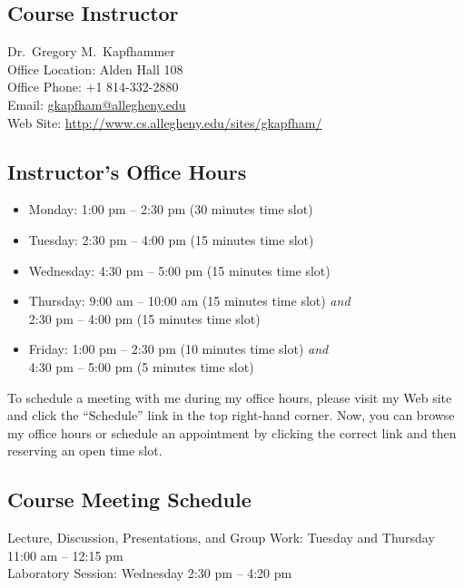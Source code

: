 



\subsection*{Course Instructor}
Dr.\ Gregory M.\ Kapfhammer\\
\noindent Office Location: Alden Hall 108 \\
\noindent Office Phone: +1 814-332-2880 \\
\noindent Email: \url{gkapfham@allegheny.edu} \\
\noindent Web Site: \url{http://www.cs.allegheny.edu/sites/gkapfham/}

\subsection*{Instructor's Office Hours}

\begin{itemize}
	\itemsep 0em
	\item Monday: 1:00 pm -- 2:30 pm (30 minutes time slot)
	\item Tuesday: 2:30 pm -- 4:00 pm (15 minutes time slot)
	\item Wednesday: 4:30 pm -- 5:00 pm (15 minutes time slot)
	\item Thursday: 9:00 am -- 10:00 am (15 minutes time slot) {\em and} \\ \hspace*{.69in} 2:30 pm -- 4:00 pm (15 minutes time slot)
	\item Friday: 1:00 pm -- 2:30 pm (10 minutes time slot) {\em and} \\ \hspace*{.49in} 4:30 pm -- 5:00 pm (5 minutes time slot)
\end{itemize}

\noindent
To schedule a meeting with me during my office hours, please visit my Web site and click the ``Schedule'' link in the
top right-hand corner. Now, you can browse my office hours or schedule an appointment by clicking the correct link and
then reserving an open time slot. 

\subsection*{Course Meeting Schedule}

Lecture, Discussion, Presentations, and Group Work: Tuesday and Thursday 11:00 am -- 12:15 pm \\
Laboratory Session: Wednesday 2:30 pm -- 4:20 pm

